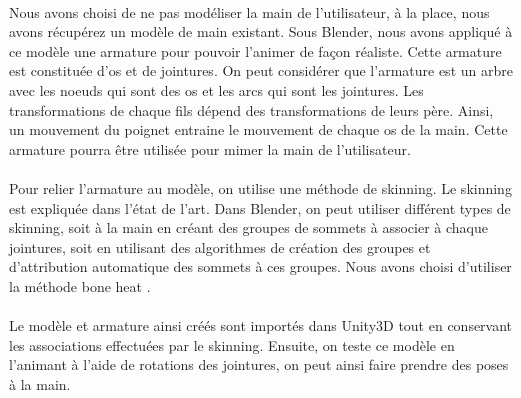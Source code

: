 \paragraph{}
Nous avons choisi de ne pas modéliser la main de l'utilisateur, à la place, nous avons récupérez un modèle de main existant.
Sous Blender, nous avons appliqué à ce modèle une armature pour pouvoir l'animer de façon réaliste. Cette armature est constituée d'os et de jointures. On peut considérer que l'armature est 
un arbre avec les noeuds qui sont des os et les arcs qui sont les jointures. Les transformations de chaque fils dépend des transformations de leurs père. Ainsi, un mouvement du poignet 
entraine le mouvement de chaque os de la main. Cette armature pourra être utilisée pour mimer la main de l'utilisateur. 

\paragraph{}
Pour relier l'armature au modèle, on utilise une méthode de skinning. Le skinning est expliquée dans l'état de l'art. Dans Blender, on peut utiliser différent types de skinning, 
soit \og à la main \fg en créant des groupes de sommets à associer à chaque jointures, soit en utilisant des algorithmes de création des groupes et d'attribution automatique des 
sommets à ces groupes. Nous avons choisi d'utiliser la méthode \og bone heat \fg. \cite{baran2007automatic}

\paragraph{}
Le modèle et armature ainsi créés sont importés dans Unity3D tout en conservant les associations effectuées par le skinning. Ensuite, on teste ce modèle en l'animant à l'aide de 
rotations des jointures, on peut ainsi faire prendre des poses à la main. 

